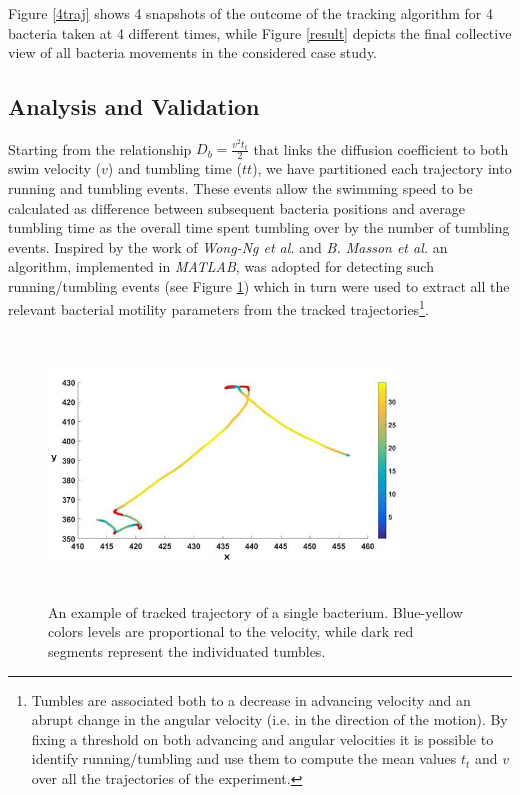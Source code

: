 \documentclass[conference]{IEEEtran}
\begin{document}
Figure \ref{4traj} shows 4 snapshots of the outcome of the tracking algorithm for 4 bacteria taken at 4 different times, while Figure \ref{result} depicts the final collective view of all bacteria movements in the considered case study. 


\subsection{Analysis and Validation}
Starting from the relationship $D_b=  \frac{v^2 t_t}{2}$  \cite{Berg:1993} that links the diffusion coefficient to both swim velocity ($v$) and tumbling time ($tt$), 
we have partitioned each trajectory into running and tumbling events. 
These events allow the swimming speed to be calculated as difference between subsequent bacteria positions and average tumbling time as the overall time spent tumbling over by the number of tumbling events. 
Inspired by the work of \textit{Wong-Ng et al.} \cite{Wong2016} and \textit{B. Masson et al.} \cite{Masson:2011} an algorithm, implemented in \textit{MATLAB}, was adopted for detecting such running/tumbling events (see Figure \ref{runtumbledetection})  which in turn were used to extract all the relevant bacterial motility parameters from the tracked trajectories\footnote{Tumbles are associated both to a decrease in advancing velocity and an abrupt change in the angular velocity (i.e. in the direction of the motion). By fixing a threshold on both advancing and angular velocities it is possible to identify running/tumbling and use them to compute the mean values $t_t$ and $v$ over all the trajectories of the experiment.}.
    \begin{figure}[htp]
         \includegraphics[width=9.3cm,height=7cm]{./images/runtumble.png}
        \caption{An example of tracked trajectory of a single bacterium. Blue-yellow colors levels are proportional to the velocity, while dark red segments represent the individuated tumbles.}
        \label{runtumbledetection}
        \vspace{-1.5em}
    \end{figure}
\end{document}
